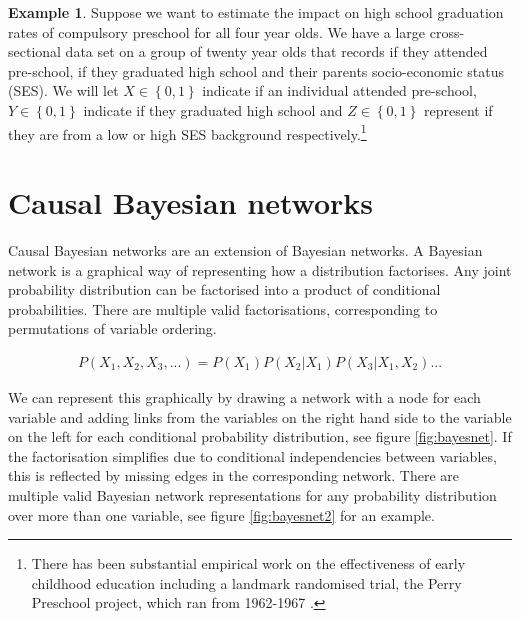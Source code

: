 \documentclass[11pt,a4paper,oneside]{book}
\newcommand{\set}[1]{\left\{#1\right\}}
\newcommand{\eqn}[1]{\begin{align}#1\end{align}}
\theoremstyle{plain}
\theoremstyle{definition}
\newtheorem{example}[theorem]{Example}
\begin{document}
\vspace*{.3cm}
\begin{example}
\label{exm:adjusting}
Suppose we want to estimate the impact on high school graduation rates of compulsory preschool for all four year olds. We have a large cross-sectional data set on a group of twenty year olds that records if they attended pre-school, if they graduated high school and their parents socio-economic status (SES). We will let $X\in \set{0,1}$ indicate if an individual attended pre-school, $Y \in \set{0,1}$ indicate if they graduated high school and $Z \in \set{0,1}$ represent if they are from a low or high SES background respectively.\footnote{There has been substantial empirical work on the effectiveness of early childhood education including a landmark randomised trial, the Perry Preschool project, which ran from 1962-1967 \citep{weikart1970longitudinal}.}
\end{example}


\section{Causal Bayesian networks}

Causal Bayesian networks are an extension of Bayesian networks. A Bayesian network is a graphical way of representing how a distribution factorises. Any joint probability distribution can be factorised into a product of conditional probabilities. There are multiple valid factorisations, corresponding to permutations of variable ordering.

\eqn{
\label{eqn:cbn:joint_dist}
P(X_{1},X_{2},X_{3},...)=P(X_{1})P(X_{2}|X_{1})P(X_{3}|X_{1},X_{2})...
}

We can represent this graphically by drawing a network with a node for each variable and adding links from the variables on the right hand side to the variable on the left for each conditional probability distribution, see figure \ref{fig:bayesnet}. If the factorisation simplifies due to conditional independencies between variables, this is reflected by missing edges in the corresponding network. There are multiple valid Bayesian network representations for any probability distribution over more than one variable, see figure \ref{fig:bayesnet2} for an example. 
\end{document}
